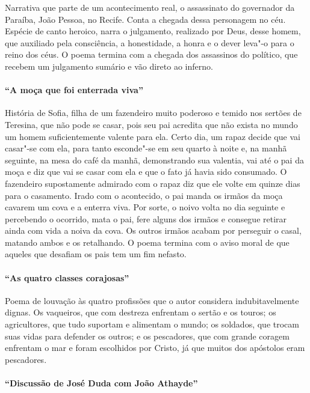 Narrativa que parte de um acontecimento real, o assassinato do
governador da Paraíba, João Pessoa, no Recife. Conta a chegada dessa
personagem no céu. Espécie de canto heroico, narra o julgamento, realizado por Deus, desse
homem, que auxiliado pela consciência, a
honestidade, a honra e o dever leva"-o para o reino dos céus. O poema
termina com a chegada dos assassinos do político, que recebem um
julgamento sumário e vão direto ao inferno. 

\paragraph{``A moça que foi enterrada viva''}

História de Sofia, filha de um fazendeiro muito poderoso e temido nos
sertões de Teresina, que não pode se casar, pois seu pai acredita que
não exista no mundo um homem suficientemente valente para ela. Certo
dia, um rapaz decide que vai casar"-se com ela, para tanto esconde"-se em
seu quarto à noite e, na manhã seguinte, na mesa do café da manhã,
demonstrando sua valentia, vai até o pai da moça e diz que vai se casar
com ela e que o fato já havia sido consumado. O fazendeiro
supostamente admirado com o rapaz diz que ele volte em quinze dias para o
casamento. Irado com o acontecido, o pai manda os irmãos da moça cavarem
um cova e a enterra viva. Por sorte, o noivo volta no dia seguinte e
percebendo o ocorrido, mata o pai, fere alguns dos irmãos e consegue
retirar ainda com vida a noiva da cova. Os outros irmãos acabam por
perseguir o casal, matando ambos e os retalhando. O poema termina com o
aviso moral de que aqueles que desafiam os pais tem um fim nefasto.

\paragraph{``As quatro classes corajosas''}

Poema de louvação às quatro profissões que o autor considera
indubitavelmente dignas. Os vaqueiros, que com destreza enfrentam o
sertão e os touros; os agricultores, que tudo suportam e alimentam o
mundo; os soldados, que trocam suas vidas para defender os outros; e os
pescadores, que com grande coragem enfrentam o mar e foram escolhidos
por Cristo, já que muitos dos apóstolos eram pescadores. 

\paragraph{``Discussão de José Duda com João
Athayde''}

